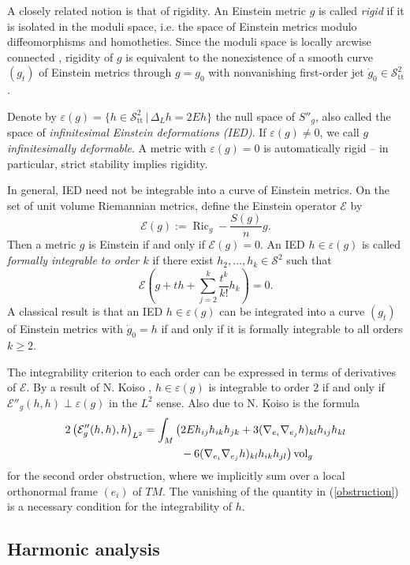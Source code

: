\documentclass[12pt]{scrartcl}
\theoremstyle{plain}
\theoremstyle{definition}
\newcommand{\Ric}{\operatorname{Ric}}%
\newcommand{\vol}{\operatorname{vol}}%
\renewcommand{\S}{\mathscr{S}}%
\newcommand{\Einstein}{E}%
\newcommand{\TT}{\S^2_{\mathrm{tt}}}%
\newcommand{\Eop}{\mathcal{E}}%
\begin{document}
A closely related notion is that of rigidity. An Einstein metric $g$ is called \emph{rigid} if it is isolated in the moduli space, i.e. the space of Einstein metrics modulo diffeomorphisms and homotheties. Since the moduli space is locally arcwise connected \cite[Cor.~12.52]{besse}, rigidity of $g$ is equivalent to the nonexistence of a smooth curve $(g_t)$ of Einstein metrics through $g=g_0$ with nonvanishing first-order jet $\dot g_0\in\TT$.

Denote by $\varepsilon(g)=\{h\in\TT\,|\,\Delta_Lh=2\Einstein h\}$ the null space of $S''_g$, also called the space of \emph{infinitesimal Einstein deformations (IED)}. If $\varepsilon(g)\neq0$, we call $g$ \emph{infinitesimally deformable}. A metric with $\varepsilon(g)=0$ is automatically rigid \cite[Cor.~12.66]{besse} -- in particular, strict stability implies rigidity.

In general, IED need not be integrable into a curve of Einstein metrics. On the set of unit volume Riemannian metrics, define the Einstein operator $\Eop$ by
\[\Eop(g):=\Ric_g-\frac{S(g)}{n}g.\]
Then a metric $g$ is Einstein if and only if $\Eop(g)=0$. An IED $h\in\varepsilon(g)$ is called \emph{formally integrable to order $k$} if there exist $h_2,\ldots,h_k\in\S^2$ such that
\[\Eop\left(g+th+\sum_{j=2}^k\frac{t^k}{k!}h_k\right)=0.\]
A classical result \cite[Cor.~12.50]{besse} is that an IED $h\in\varepsilon(g)$ can be integrated into a curve $(g_t)$ of Einstein metrics with $\dot g_0=h$ if and only if it is formally integrable to all orders $k\geq2$.

The integrability criterion to each order can be expressed in terms of derivatives of $\Eop$. By a result of N. Koiso \cite[Lem.~4.7]{koisorigidity}, $h\in\varepsilon(g)$ is integrable to order $2$ if and only if $\Eop''_g(h,h)\perp\varepsilon(g)$ in the $L^2$ sense. Also due to N. Koiso \cite[Lem.~4.3]{koisorigidity} is the formula
\begin{align}
2\left(\Eop''_g(h,h),h\right)_{L^2}=\int_M\big(&2\Einstein h_{ij}h_{ik}h_{jk}+3(\nabla_{e_i}\nabla_{e_j}h)_{kl}h_{ij}h_{kl}\notag\\
&-6(\nabla_{e_i}\nabla_{e_j}h)_{kl}h_{ik}h_{jl}\big)\vol_g
\label{obstruction}%
\end{align}
for the second order obstruction, where we implicitly sum over a local orthonormal frame $(e_i)$ of $TM$. The vanishing of the quantity in (\ref{obstruction}) is a necessary condition for the integrability of $h$.

\subsection{Harmonic analysis}
\label{sec:prelimha}
\end{document}
